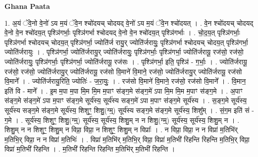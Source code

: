 \documentclass[17pt]{extarticle}
\begin{document}
\textbf{Ghana Paata } \newline

1. अ॒यं ॅवे॒नो वे॒नो॑ ऽय म॒यं ॅवे॒न श्चो॑दयच् चोदयद् वे॒नो॑ ऽय म॒यं ॅवे॒न श्चो॑दयत् । . वे॒न श्चो॑दयच् चोदयद् वे॒नो वे॒न श्चो॑दय॒त् पृश्ञि॑गर्भाः॒ पृश्ञि॑गर्भा श्चोदयद् वे॒नो वे॒न श्चो॑दय॒त् पृश्ञि॑गर्भाः । . चो॒द॒य॒त् पृश्ञि॑गर्भाः॒ पृश्ञि॑गर्भा श्चोदयच् चोदय॒त् पृश्ञि॑गर्भा॒ ज्योति॑र्ज रायु॒र् ज्योति॑र्जरायुः॒ पृश्ञि॑गर्भा श्चोदयच् चोदय॒त् पृश्ञि॑गर्भा॒ ज्योति॑र्जरायुः । . पृश्ञि॑गर्भा॒ ज्योति॑र्जरायु॒र् ज्योति॑र्जरायुः॒ पृश्ञि॑गर्भाः॒ पृश्ञि॑गर्भा॒ ज्योति॑र्जरायू॒ रज॑सो॒ रज॑सो॒ ज्योति॑र्जरायुः॒ पृश्ञि॑गर्भाः॒ पृश्ञि॑गर्भा॒ ज्योति॑र्जरायू॒ रज॑सः । . पृश्ञि॑गर्भा॒ इति॒ पृश्ञि॑ - ग॒र्भाः॒ । . ज्योति॑र्जरायू॒ रज॑सो॒ रज॑सो॒ ज्योति॑र्जरायु॒र् ज्योति॑र्जरायू॒ रज॑सो वि॒माने॑ वि॒माने॒ रज॑सो॒ ज्योति॑र्जरायु॒र् ज्योति॑र्जरायू॒ रज॑सो वि॒माने᳚ । . ज्योति॑र्जरायु॒रिति॒ ज्योतिः॑ - ज॒रा॒युः॒ । . रज॑सो वि॒माने॑ वि॒माने॒ रज॑सो॒ रज॑सो वि॒माने᳚ । . वि॒मान॒ इति॑ वि - माने᳚ । . इ॒म म॒पा म॒पा मि॒म मि॒म म॒पाꣳ स॑ङ्ग॒मे स॑ङ्ग॒मे॑ ऽपा मि॒म मि॒म म॒पाꣳ स॑ङ्ग॒मे । . अ॒पाꣳ स॑ङ्ग॒मे स॑ङ्ग॒मे॑ ऽपा म॒पाꣳ स॑ङ्ग॒मे सूर्य॑स्य॒ सूर्य॑स्य सङ्ग॒मे॑ ऽपा म॒पाꣳ स॑ङ्ग॒मे सूर्य॑स्य । . स॒ङ्ग॒मे सूर्य॑स्य॒ सूर्य॑स्य सङ्ग॒मे स॑ङ्ग॒मे सूर्य॑स्य॒ शिशुꣳ॒॒ शिशु॒(ग्म्॒) सूर्य॑स्य सङ्ग॒मे स॑ङ्ग॒मे सूर्य॑स्य॒ शिशु᳚म् । . सं॒ग॒म इति॑ सं - ग॒मे । . सूर्य॑स्य॒ शिशुꣳ॒॒ शिशु॒(ग्म्॒) सूर्य॑स्य॒ सूर्य॑स्य॒ शिशु॒म् न न शिशु॒(ग्म्॒) सूर्य॑स्य॒ सूर्य॑स्य॒ शिशु॒म् न । . शिशु॒म् न न शिशुꣳ॒॒ शिशु॒म् न विप्रा॒ विप्रा॒ न शिशुꣳ॒॒ शिशु॒म् न विप्राः᳚ । . न विप्रा॒ विप्रा॒ न न विप्रा॑ म॒तिभि॑र् म॒तिभि॒र् विप्रा॒ न न विप्रा॑ म॒तिभिः॑ । . विप्रा॑ म॒तिभि॑र् म॒तिभि॒र् विप्रा॒ विप्रा॑ म॒तिभी॑ रिहन्ति रिहन्ति म॒तिभि॒र् विप्रा॒ विप्रा॑ म॒तिभी॑ रिहन्ति । . म॒तिभी॑ रिहन्ति रिहन्ति म॒तिभि॑र् म॒तिभी॑ रिहन्ति । \newline
\end{document}
